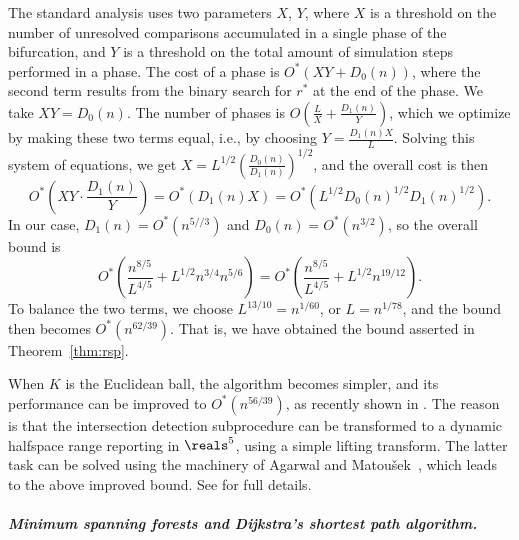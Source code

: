The standard analysis uses two parameters $X$, $Y$, where $X$ is a threshold on the 
number of unresolved comparisons accumulated in a single phase of the bifurcation, 
and $Y$ is a threshold
on the total amount of simulation steps performed in a phase. The cost of a phase is
$O^*(XY + D_0(n))$, where the second term results from the binary search for $r^*$ at the 
end of the phase. We take $XY = D_0(n)$. The number of phases is 
${\displaystyle O\left( \frac{L}{X} + \frac{D_1(n)}{Y} \right)}$, which we optimize by making 
these two terms equal, i.e., by choosing ${\displaystyle Y = \frac{D_1(n)X}{L}}$. Solving this 
system of equations, we get ${\displaystyle X = L^{1/2}\left( \frac{D_0(n)}{D_1(n)}\right)^{1/2}}$, 
and the overall cost is then
\[
O^*\left( XY\cdot \frac{D_1(n)}{Y} \right) = O^*(D_1(n)X) = O^*(L^{1/2}D_0(n)^{1/2}D_1(n)^{1/2}) .
\]
In our case, $D_1(n) = O^*(n^{5//3})$ and $D_0(n) = O^*(n^{3/2})$, so the overall bound is
\[
O^*\left( \frac{n^{8/5}}{L^{4/5}} + L^{1/2}n^{3/4}n^{5/6} \right) =
O^*\left( \frac{n^{8/5}}{L^{4/5}} + L^{1/2}n^{19/12} \right) .
\]
To balance the two terms, we choose $L^{13/10} = n^{1/60}$, or $L = n^{1/78}$, and the bound then becomes
$O^*\left(n^{62/39} \right)$. That is, we have obtained the bound asserted in Theorem~\ref{thm:rsp}.
%
\medskip
\begin{remark}
When $K$ is the Euclidean ball, the algorithm becomes simpler, and its performance can be
improved to $O^*(n^{56/39})$, as recently shown in \cite{KSS}. The reason is that the intersection
detection subprocedure can be transformed to a dynamic halfspace range reporting in $\reals^5$,
using a simple lifting transform. The latter task can be solved using the machinery of Agarwal and
Matou\v{s}ek~\cite{AM95}, which leads to the above improved bound. See \cite{KSS} for full details.
\end{remark}
%
\ifsocgproc
\subparagraph*{Minimum spanning forests and Dijkstra's shortest path algorithm.}
\else
